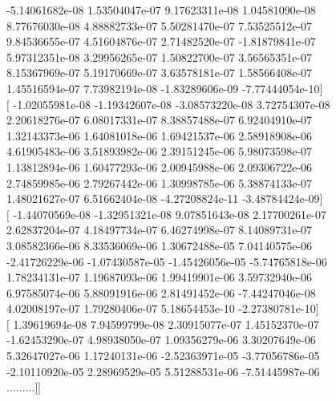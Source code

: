 \documentclass{article}
\begin{document}
   -5.14061682e-08   1.53504047e-07   9.17623311e-08   1.04581090e-08 \\
    8.77676030e-08   4.88882733e-07   5.50281470e-07   7.53525512e-07 \\
    9.84536655e-07   4.51604876e-07   2.71482520e-07  -1.81879841e-07 \\
    5.97312351e-08   3.29956265e-07   1.50822700e-07   3.56565351e-07 \\
    8.15367969e-07   5.19170669e-07   3.63578181e-07   1.58566408e-07 \\
    1.45516594e-07   7.73982194e-08  -1.83289606e-09  -7.77444054e-10$]$ \\
 $[$ -1.02055981e-08  -1.19342607e-08  -3.08573220e-08   3.72754307e-08 \\
    2.20618276e-07   6.08017331e-07   8.38857488e-07   6.92404910e-07 \\
    1.32143373e-06   1.64081018e-06   1.69421537e-06   2.58918908e-06 \\
    4.61905483e-06   3.51893982e-06   2.39151245e-06   5.98073598e-07 \\
    1.13812894e-06   1.60477293e-06   2.00945988e-06   2.09306722e-06 \\
    2.74859985e-06   2.79267442e-06   1.30998785e-06   5.38874133e-07 \\
    1.48021627e-07   6.51662404e-08  -4.27208824e-11  -3.48784424e-09$]$ \\
 $[$ -1.44070569e-08  -1.32951321e-08   9.07851643e-08   2.17700261e-07 \\
    2.62837204e-07   4.18497734e-07   6.46274998e-07   8.14089731e-07 \\
    3.08582366e-06   8.33536069e-06   1.30672488e-05   7.04140575e-06 \\
   -2.41726229e-06  -1.07430587e-05  -1.45426056e-05  -5.74765818e-06 \\
    1.78234131e-07   1.19687093e-06   1.99419901e-06   3.59732940e-06 \\
    6.97585074e-06   5.88091916e-06   2.81491452e-06  -7.44247046e-08 \\
    4.02008197e-07   1.79280406e-07   5.18654453e-10  -2.27380781e-10$]$ \\
 $[$  1.39619694e-08   7.94599799e-08   2.30915077e-07   1.45152370e-07 \\
   -1.62453290e-07   4.98938050e-07   1.09356279e-06   3.30207649e-06 \\
    5.32647027e-06   1.17240131e-06  -2.52363971e-05  -3.77056786e-05 \\
   -2.10110920e-05   2.28969529e-05   5.51288531e-06  -7.51445987e-06 \\
   $\dots \dots \dots ]]$
\end{document}
